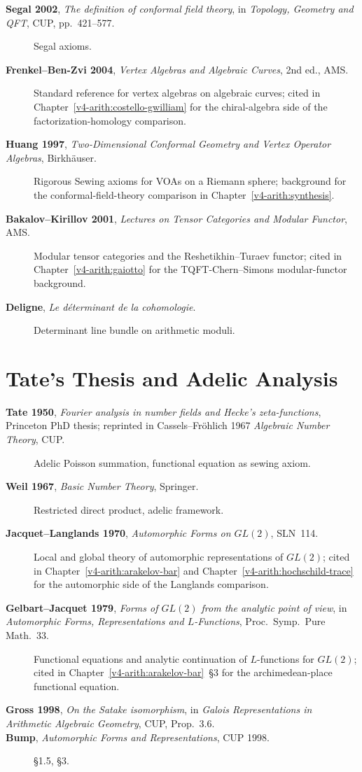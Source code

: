 \begin{description}
\item[\textbf{Segal 2002}, \emph{The definition of conformal field
theory}, in \emph{Topology, Geometry and QFT}, CUP, pp.~421--577.]
Segal axioms.
\item[\textbf{Frenkel--Ben-Zvi 2004}, \emph{Vertex Algebras and
Algebraic Curves}, 2nd ed., AMS.] Standard reference for vertex
algebras on algebraic curves; cited in
Chapter~\ref{v4-arith:costello-gwilliam} for the chiral-algebra
side of the factorization-homology comparison.
\item[\textbf{Huang 1997}, \emph{Two-Dimensional Conformal Geometry
and Vertex Operator Algebras}, Birkh\"auser.] Rigorous
Sewing axioms for VOAs on a Riemann sphere; background for
the conformal-field-theory comparison in
Chapter~\ref{v4-arith:synthesis}.
\item[\textbf{Bakalov--Kirillov 2001}, \emph{Lectures on Tensor
Categories and Modular Functor}, AMS.] Modular tensor categories
and the Reshetikhin--Turaev functor; cited in
Chapter~\ref{v4-arith:gaiotto} for the TQFT-Chern--Simons
modular-functor background.
\item[\textbf{Deligne}, \emph{Le d\'eterminant de la cohomologie}.]
Determinant line bundle on arithmetic moduli.
\end{description}

\section{Tate's Thesis and Adelic Analysis}
\label{v4-arith:app:A:tate}

\begin{description}
\item[\textbf{Tate 1950}, \emph{Fourier analysis in number fields
and Hecke's zeta-functions}, Princeton PhD thesis; reprinted in
Cassels--Fr\"ohlich 1967 \emph{Algebraic Number Theory}, CUP.]
Adelic Poisson summation, functional equation as sewing axiom.
\item[\textbf{Weil 1967}, \emph{Basic Number Theory}, Springer.]
Restricted direct product, adelic framework.
\item[\textbf{Jacquet--Langlands 1970}, \emph{Automorphic Forms on
\(GL(2)\)}, SLN~114.] Local and global theory of automorphic
representations of \(GL(2)\); cited in
Chapter~\ref{v4-arith:arakelov-bar} and
Chapter~\ref{v4-arith:hochschild-trace} for the
automorphic side of the Langlands comparison.
\item[\textbf{Gelbart--Jacquet 1979}, \emph{Forms of \(GL(2)\) from
the analytic point of view}, in \emph{Automorphic Forms,
Representations and \(L\)-Functions}, Proc.~Symp.~Pure Math.~33.]
Functional equations and analytic continuation of \(L\)-functions
for \(GL(2)\); cited in Chapter~\ref{v4-arith:arakelov-bar}~\S3
for the archimedean-place functional equation.
\item[\textbf{Gross 1998}, \emph{On the Satake isomorphism}, in
\emph{Galois Representations in Arithmetic Algebraic Geometry},
CUP, Prop.~3.6.]
\item[\textbf{Bump}, \emph{Automorphic Forms and Representations},
CUP 1998.] \S1.5, \S3.
\end{description}

